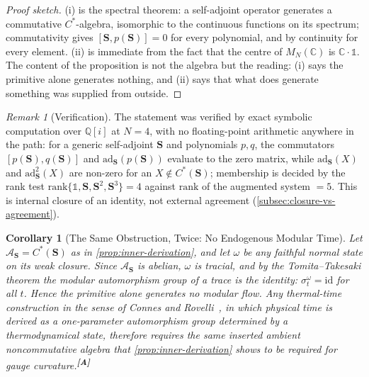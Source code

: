 \documentclass[12pt,a4paper,twoside]{article}
\theoremstyle{plain}
\newtheorem{corollary}[theorem]{Corollary}
\theoremstyle{definition}
\theoremstyle{remark}
\newtheorem{remark}[theorem]{Remark}
\newcommand{\catmark}[1]{\textsuperscript{\textsf{\textbf{[#1]}}}}
\begin{document}
\begin{proof}[Proof sketch]
(i) is the spectral theorem: a self-adjoint operator generates a
commutative $C^{\ast}$-algebra, isomorphic to the continuous functions on
its spectrum; commutativity gives $[\mathbf S, p(\mathbf S)] = 0$ for
every polynomial, and by continuity for every element. (ii) is immediate
from the fact that the centre of $M_N(\mathbb C)$ is $\mathbb
C\!\cdot\!\mathbb 1$. The content of the proposition is not the algebra
but the reading: (i) says the primitive alone generates nothing, and (ii)
says that what does generate something was supplied from outside.
\end{proof}

\begin{remark}[Verification]
\label{rem:inner-derivation-check}
The statement was verified by exact symbolic computation over
$\mathbb Q[i]$ at $N=4$, with no floating-point arithmetic anywhere in
the path: for a generic self-adjoint $\mathbf S$ and polynomials $p, q$,
the commutators $[p(\mathbf S), q(\mathbf S)]$ and
$\mathrm{ad}_{\mathbf S}(p(\mathbf S))$ evaluate to the zero matrix,
while $\mathrm{ad}_{\mathbf S}(X)$ and $\mathrm{ad}_{\mathbf S}^{2}(X)$
are non-zero for an $X \notin C^{\ast}(\mathbf S)$; membership is decided
by the rank test $\mathrm{rank}\{\mathbb 1, \mathbf S, \mathbf S^2,
\mathbf S^3\} = 4$ against $\mathrm{rank}$ of the augmented system $= 5$.
This is internal closure of an identity, not external agreement
(\cref{subsec:closure-vs-agreement}).
\end{remark}

\begin{corollary}[The Same Obstruction, Twice: No Endogenous Modular Time]
\label{cor:modular-relocation}
Let $\mathcal A_{\mathbf S} = C^{\ast}(\mathbf S)$ as in
\cref{prop:inner-derivation}, and let $\omega$ be any faithful normal
state on its weak closure. Since $\mathcal A_{\mathbf S}$ is abelian,
$\omega$ is tracial, and by the Tomita--Takesaki theorem the modular
automorphism group of a trace is the identity: $\sigma^{\omega}_t =
\mathrm{id}$ for all $t$. Hence the primitive alone generates no modular
flow. Any thermal-time construction in the sense of Connes and
Rovelli~\cite{connesrovelli1994}, in which physical time is derived as a
one-parameter automorphism group determined by a thermodynamical state,
therefore requires the same inserted ambient noncommutative algebra that
\cref{prop:inner-derivation} shows to be required for gauge
curvature.\catmark{A}
\end{corollary}
\end{document}

